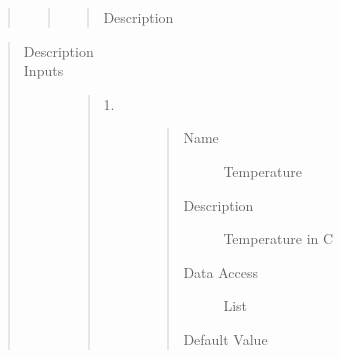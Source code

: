 \documentclass[letterpaper,10pt,english]{sphinxmanual}
\begin{document}
\begin{quote}
\begin{description}
\begin{quote}
\begin{description}
\begin{quote}
\begin{description}
\item[{Description}] \leavevmode
{}

\end{description}\end{quote}

\end{description}\end{quote}

\end{description}\end{quote}

\begin{quote}\begin{description}
\item[{Description}] \leavevmode
{}

\item[{Inputs}] \leavevmode\begin{quote}\begin{description}
\item[{1.}] \leavevmode\begin{quote}\begin{description}
\item[{Name}] \leavevmode
Temperature

\item[{Description}] \leavevmode
Temperature in C

\item[{Data Access}] \leavevmode
List

\item[{Default Value}] \leavevmode
{}

\end{description}\end{quote}

\end{description}\end{quote}


\end{description}
\end{quote}
\end{document}
